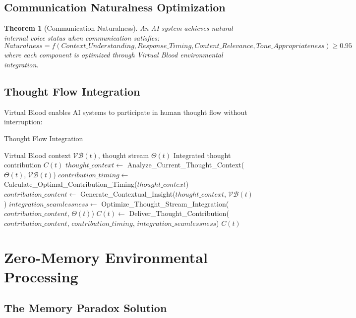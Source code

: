 \documentclass[12pt,a4paper]{article}
\newtheorem{theorem}{Theorem}
\begin{document}
\subsection{Communication Naturalness Optimization}

\begin{theorem}[Communication Naturalness]
An AI system achieves natural internal voice status when communication satisfies:
\begin{equation}
Naturalness = f(Context\_Understanding, Response\_Timing, Content\_Relevance, Tone\_Appropriateness) \geq 0.95
\end{equation}
where each component is optimized through Virtual Blood environmental integration.
\end{theorem}

\subsection{Thought Flow Integration}

Virtual Blood enables AI systems to participate in human thought flow without interruption:

\begin{algorithm}
\caption{Thought Flow Integration}
\begin{algorithmic}[1]
\REQUIRE Virtual Blood context $\mathcal{VB}(t)$, thought stream $\Theta(t)$
\ENSURE Integrated thought contribution $C(t)$
\STATE $thought\_context \leftarrow$ Analyze\_Current\_Thought\_Context($\Theta(t)$, $\mathcal{VB}(t)$)
\STATE $contribution\_timing \leftarrow$ Calculate\_Optimal\_Contribution\_Timing($thought\_context$)
\STATE $contribution\_content \leftarrow$ Generate\_Contextual\_Insight($thought\_context$, $\mathcal{VB}(t)$)
\STATE $integration\_seamlessness \leftarrow$ Optimize\_Thought\_Stream\_Integration($contribution\_content$, $\Theta(t)$)
\STATE $C(t) \leftarrow$ Deliver\_Thought\_Contribution($contribution\_content$, $contribution\_timing$, $integration\_seamlessness$)
\RETURN $C(t)$
\end{algorithmic}
\end{algorithm}

\section{Zero-Memory Environmental Processing}

\subsection{The Memory Paradox Solution}
\end{document}

